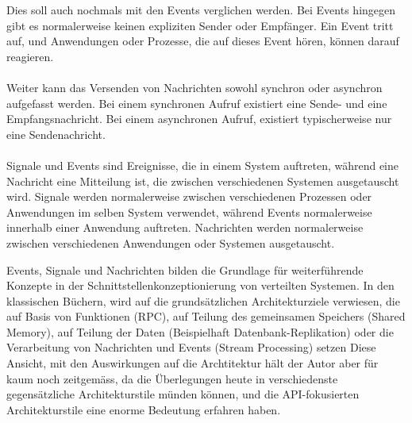 \documentclass[../vs-script-first-v01.tex]{subfiles}
\begin{document}
Dies soll auch nochmals mit den Events verglichen werden. Bei Events hingegen gibt es normalerweise keinen expliziten Sender oder Empfänger. Ein Event tritt auf, und Anwendungen oder Prozesse, die auf dieses Event hören, können darauf reagieren. 
\\\\
Weiter kann das Versenden von Nachrichten sowohl synchron oder asynchron aufgefasst werden. Bei einem synchronen Aufruf existiert eine Sende- und eine Empfangsnachricht. Bei einem asynchronen Aufruf, existiert  typischerweise nur eine Sendenachricht.
\\\\
Signale und Events sind Ereignisse, die in einem System auftreten, während eine Nachricht eine Mitteilung ist, die zwischen verschiedenen Systemen ausgetauscht wird. Signale werden normalerweise zwischen verschiedenen Prozessen oder Anwendungen im selben System verwendet, während Events normalerweise innerhalb einer Anwendung auftreten. Nachrichten werden normalerweise zwischen verschiedenen Anwendungen oder Systemen ausgetauscht.

Events, Signale und Nachrichten bilden die Grundlage für weiterführende Konzepte in der Schnittstellenkonzeptionierung von verteilten Systemen. In den klassischen Büchern, wird auf die grundsätzlichen Architekturziele verwiesen, die auf Basis von Funktionen (RPC), auf Teilung des gemeinsamen Speichers (Shared Memory), auf Teilung der Daten (Beispielhaft Datenbank-Replikation) oder die Verarbeitung von Nachrichten und Events (Stream Processing)  setzen
Diese Ansicht, mit den Auswirkungen auf die Archtitektur hält der Autor aber für kaum noch zeitgemäss, da die Überlegungen heute in verschiedenste gegensätzliche Architekturstile münden können, und die API-fokusierten Architekturstile eine enorme Bedeutung erfahren haben.  
\end{document}
